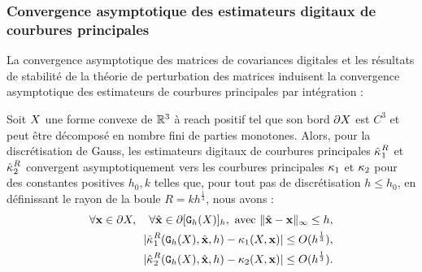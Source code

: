 \subsubsection{Convergence asymptotique des estimateurs digitaux de courbures principales}
%
La convergence asymptotique des matrices de covariances digitales et les
résultats de stabilité de la théorie de perturbation des matrices induisent la
convergence asymptotique des estimateurs de courbures principales par
intégration :
%
\begin{theorem}{}
\label{thm:multigrid-convergence-curv-k1k2}
%
  Soit $X$ une forme convexe de $\mathbb{R}^3$ à reach positif tel que son bord
  $\partial X$ est $C^3$ et peut être décomposé en nombre fini de parties monotones.
  Alors, pour la discrétisation de Gauss, les estimateurs digitaux de courbures
  principales $\hat{\kappa_{}}_{1}^{R}$ et $\hat{\kappa_{}}_{2}^{R}$ convergent
  asymptotiquement vers les courbures principales $\kappa_{1}$ et
  $\kappa_{2}$ pour des constantes positives $h_0,
  k$ telles que, pour tout pas de discrétisation $h \le h_0$, en définissant le
  rayon de la boule $R = kh^{\frac{1}{3}}$, nous avons :
  \begin{align}
     \forall \mathbf{x} \in \partial X, \quad \forall \hat{\mathbf{x}} \in \partial \lbrack \mathtt{G}_{h}(X) \rbrack_{h}, \text{~avec~} \| \hat{\mathbf{x}} -\mathbf{x}\|_\infty \le h,\nonumber\\
     | \hat{\kappa_{}}_{1}^{R}(\mathtt{G}_{h}(X),\hat{\mathbf{x}},h) - \kappa_{1}(X,\mathbf{x}) | \le O(h^{\frac{1}{3}}) ,\\
     | \hat{\kappa_{}}_{2}^{R}(\mathtt{G}_{h}(X),\hat{\mathbf{x}},h) - \kappa_{2}(X,\mathbf{x}) | \le O(h^{\frac{1}{3}}) .
  \end{align}
\end{theorem}
